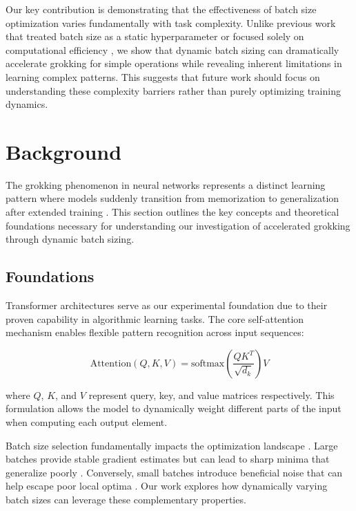 \documentclass{article} %
\begin{document}
Our key contribution is demonstrating that the effectiveness of batch size optimization varies fundamentally with task complexity. Unlike previous work that treated batch size as a static hyperparameter \citep{power2022grokking} or focused solely on computational efficiency \citep{Goyal2017AccurateLM}, we show that dynamic batch sizing can dramatically accelerate grokking for simple operations while revealing inherent limitations in learning complex patterns. This suggests that future work should focus on understanding these complexity barriers rather than purely optimizing training dynamics.

\section{Background}
\label{sec:background}

The grokking phenomenon in neural networks represents a distinct learning pattern where models suddenly transition from memorization to generalization after extended training \citep{power2022grokking}. This section outlines the key concepts and theoretical foundations necessary for understanding our investigation of accelerated grokking through dynamic batch sizing.

\subsection{Foundations}
Transformer architectures \citep{vaswani2017attention} serve as our experimental foundation due to their proven capability in algorithmic learning tasks. The core self-attention mechanism enables flexible pattern recognition across input sequences:

\begin{equation}
    \text{Attention}(Q,K,V) = \text{softmax}\left(\frac{QK^T}{\sqrt{d_k}}\right)V
\end{equation}

where $Q$, $K$, and $V$ represent query, key, and value matrices respectively. This formulation allows the model to dynamically weight different parts of the input when computing each output element.

Batch size selection fundamentally impacts the optimization landscape \citep{goodfellow2016deep}. Large batches provide stable gradient estimates but can lead to sharp minima that generalize poorly \citep{Keskar2016OnLT}. Conversely, small batches introduce beneficial noise that can help escape poor local optima \citep{Smith2017DontDT}. Our work explores how dynamically varying batch sizes can leverage these complementary properties.
\end{document}
